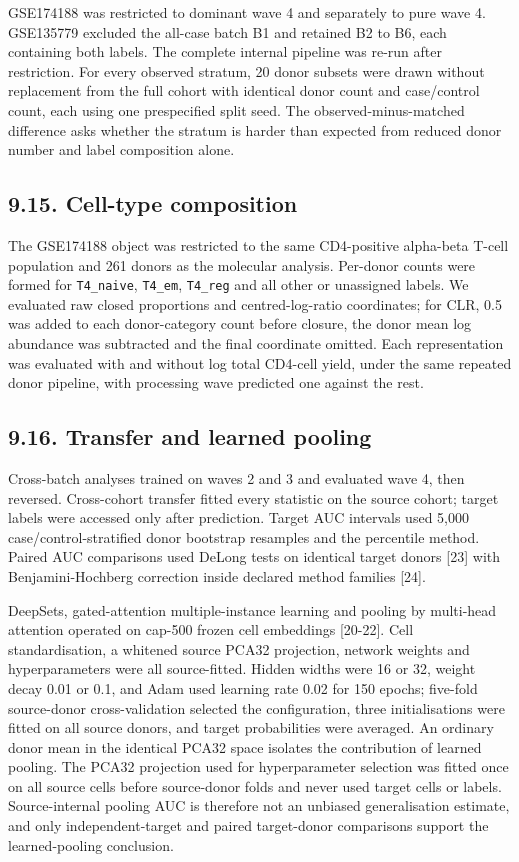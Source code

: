 GSE174188 was restricted to dominant wave 4 and separately to pure wave 4. GSE135779 excluded the all-case batch B1 and retained B2 to B6, each containing both labels. The complete internal pipeline was re-run after restriction. For every observed stratum, 20 donor subsets were drawn without replacement from the full cohort with identical donor count and case/control count, each using one prespecified split seed. The observed-minus-matched difference asks whether the stratum is harder than expected from reduced donor number and label composition alone.

\subsection{9.15. Cell-type composition}\label{cell-type-composition}

The GSE174188 object was restricted to the same CD4-positive alpha-beta T-cell population and 261 donors as the molecular analysis. Per-donor counts were formed for \texttt{T4\_naive}, \texttt{T4\_em}, \texttt{T4\_reg} and all other or unassigned labels. We evaluated raw closed proportions and centred-log-ratio coordinates; for CLR, 0.5 was added to each donor-category count before closure, the donor mean log abundance was subtracted and the final coordinate omitted. Each representation was evaluated with and without log total CD4-cell yield, under the same repeated donor pipeline, with processing wave predicted one against the rest.

\subsection{9.16. Transfer and learned pooling}\label{transfer-and-learned-pooling}

Cross-batch analyses trained on waves 2 and 3 and evaluated wave 4, then reversed. Cross-cohort transfer fitted every statistic on the source cohort; target labels were accessed only after prediction. Target AUC intervals used 5,000 case/control-stratified donor bootstrap resamples and the percentile method. Paired AUC comparisons used DeLong tests on identical target donors {[}23{]} with Benjamini-Hochberg correction inside declared method families {[}24{]}.

DeepSets, gated-attention multiple-instance learning and pooling by multi-head attention operated on cap-500 frozen cell embeddings {[}20-22{]}. Cell standardisation, a whitened source PCA32 projection, network weights and hyperparameters were all source-fitted. Hidden widths were 16 or 32, weight decay 0.01 or 0.1, and Adam used learning rate 0.02 for 150 epochs; five-fold source-donor cross-validation selected the configuration, three initialisations were fitted on all source donors, and target probabilities were averaged. An ordinary donor mean in the identical PCA32 space isolates the contribution of learned pooling. The PCA32 projection used for hyperparameter selection was fitted once on all source cells before source-donor folds and never used target cells or labels. Source-internal pooling AUC is therefore not an unbiased generalisation estimate, and only independent-target and paired target-donor comparisons support the learned-pooling conclusion.

